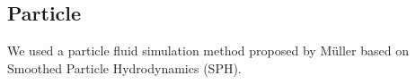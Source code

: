 \subsection{Particle}
We used a particle fluid simulation method proposed by Müller \cite{Muller2003} based on Smoothed Particle Hydrodynamics (SPH).
